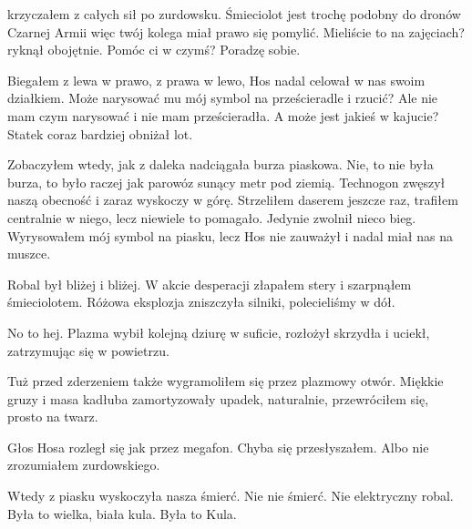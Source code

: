 \begin{dialogue}
\ds{}  \dm{} krzyczałem z całych sił po zurdowsku.
\ds{} Śmieciolot jest trochę podobny do dronów Czarnej Armii więc twój kolega miał prawo się pomylić. Mieliście to na zajęciach? \dm{} ryknął obojętnie. \dm{} Pomóc ci w czymś?
\ds{} Poradzę sobie.
\end{dialogue}

Biegałem z lewa w prawo, z prawa w lewo, Hos nadal celował w nas swoim działkiem.
Może narysować mu mój symbol na prześcieradle i rzucić? Ale nie mam czym narysować i nie mam prześcieradła.
A może jest jakieś w kajucie?
Statek coraz bardziej obniżał lot.

Zobaczyłem wtedy, jak z daleka nadciągała burza piaskowa.
Nie, to nie była burza, to było raczej jak parowóz sunący metr pod ziemią.
Technogon zwęszył naszą obecność i zaraz wyskoczy w górę.
Strzeliłem daserem jeszcze raz, trafiłem centralnie w niego, lecz niewiele to pomagało. Jedynie zwolnił nieco bieg.
Wyrysowałem mój symbol na piasku, lecz Hos nie zauważył i nadal miał nas na muszce.

Robal był bliżej i bliżej.
W akcie desperacji złapałem stery i szarpnąłem śmieciolotem.
Różowa eksplozja zniszczyła silniki, polecieliśmy w dół.
\begin{dialogue}
\ds{} No to hej. \dm{} Plazma wybił kolejną dziurę w suficie, rozłożył skrzydła i uciekł, zatrzymując się w powietrzu.
\end{dialogue}

Tuż przed zderzeniem także wygramoliłem się przez plazmowy otwór.
Miękkie gruzy i masa kadłuba zamortyzowały upadek, naturalnie, przewróciłem się, prosto na twarz.

\begin{dialogue}
\ds{}  \dm{} Głos Hosa rozległ się jak przez megafon.
\ds{}  \dm{} Chyba się przesłyszałem. Albo nie zrozumiałem zurdowskiego.
\end{dialogue}

Wtedy z piasku wyskoczyła nasza śmierć.
Nie nie śmierć. Nie elektryczny robal.
Była to wielka, biała kula.
Była to Kula.

